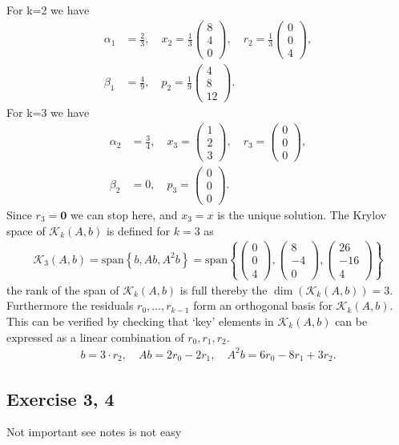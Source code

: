 For k=2 we have
\begin{align}
    \alpha_1 &= \frac{2}{3}, \quad x_2=\frac{1}{3}\begin{pmatrix} 8 \\ 4 \\0
        \end{pmatrix}, \quad r_2 = \frac{1}{3}\begin{pmatrix} 0 \\ 0 \\4
    \end{pmatrix},\\
    \beta_1 &= \frac{4}{9},\quad p_2 = \frac{1}{9}\begin{pmatrix} 4\\8\\12
    \end{pmatrix}.
\end{align}
For k=3 we have
\begin{align}
    \alpha_2 &= \frac{3}{4}, \quad x_3=\begin{pmatrix} 1 \\ 2 \\3
        \end{pmatrix}, \quad r_3 = \begin{pmatrix} 0 \\ 0 \\0
    \end{pmatrix},\\
    \beta_2 &= 0,\quad p_3 = \begin{pmatrix} 0\\0\\0
    \end{pmatrix}.
\end{align}
Since $r_3 = \textbf{0}$ we can stop here, and $x_3 = x$ is the unique
solution. The Krylov space of $\mathcal{K}_k(A, b)$ is defined for $k=3$ as
\begin{align}
    \mathcal{K}_3(A,b) = \text{span}\left\{b, Ab, A^2b \right\} = \text{span} \left\{ \begin{pmatrix} 0\\0\\4 \end{pmatrix},
             \begin{pmatrix} 8\\-4\\0 \end{pmatrix},
         \begin{pmatrix}26\\-16\\4\end{pmatrix}\right\}
\end{align}
the rank of the span of $\mathcal{K}_k(A,b)$ is full thereby the
$\dim(\mathcal{K}_k(A,b)) = 3$. Furthermore the residuals $r_0,\ldots,
r_{k-1}$ form an orthogonal basis for $\mathcal{K}_k(A,b)$. This can be
verified by checking that `key' elements in $\mathcal{K}_k(A, b)$ can be
expressed as a linear combination of $r_0, r_1, r_2$.
\begin{align}
    b = 3\cdot r_2,\quad Ab = 2r_0-2r_1,\quad A^2b=6r_0-8r_1+3r_2.
\end{align}
\subsection{Exercise 3, 4}
Not important see notes is not easy

